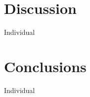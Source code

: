 \documentclass[10pt,a4paper,twocolumn]{article}
\begin{document}
\section*{Discussion}
Individual

\section*{Conclusions}
Individual

{\small

\nocite{rosch1975family}
\nocite{lake2015deep}
\nocite{minda2002comparing}
\nocite{smith1998prototypes}
\nocite{reed1972pattern}
\nocite{rosch1999principles}
\nocite{posner1968genesis}

}
\end{document}
